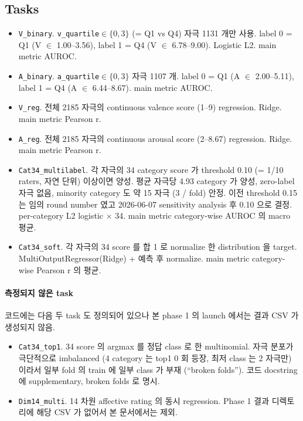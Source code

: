 \documentclass[a4paper,11pt]{article}
\begin{document}
\subsection{Tasks}

\begin{itemize}[leftmargin=*, itemsep=2pt]
  \item \texttt{V\_binary}. \texttt{v\_quartile}$\in\{0,3\}$ (= Q1 vs Q4) 자극 1131 개만 사용. label 0 = Q1 (V $\in$ 1.00--3.56), label 1 = Q4 (V $\in$ 6.78--9.00). Logistic L2. main metric AUROC.
  \item \texttt{A\_binary}. \texttt{a\_quartile}$\in\{0,3\}$ 자극 1107 개. label 0 = Q1 (A $\in$ 2.00--5.11), label 1 = Q4 (A $\in$ 6.44--8.67). main metric AUROC.
  \item \texttt{V\_reg}. 전체 2185 자극의 continuous valence score (1--9) regression. Ridge. main metric Pearson r.
  \item \texttt{A\_reg}. 전체 2185 자극의 continuous arousal score (2--8.67) regression. Ridge. main metric Pearson r.
  \item \texttt{Cat34\_multilabel}. 각 자극의 34 category score 가 threshold 0.10 (= 1/10 raters, 자연 단위) 이상이면 양성. 평균 자극당 4.93 category 가 양성, zero-label 자극 없음, minority category 도 약 15 자극 (3 / fold) 안정. 이전 threshold 0.15 는 임의 round number 였고 2026-06-07 sensitivity analysis 후 0.10 으로 결정. per-category L2 logistic $\times$ 34. main metric category-wise AUROC 의 macro 평균.
  \item \texttt{Cat34\_soft}. 각 자극의 34 score 를 합 1 로 normalize 한 distribution 을 target. MultiOutputRegressor(Ridge) + 예측 후 normalize. main metric category-wise Pearson r 의 평균.
\end{itemize}

\paragraph{측정되지 않은 task} 코드에는 다음 두 task 도 정의되어 있으나 본 phase 1 의 launch 에서는 결과 CSV 가 생성되지 않음.
\begin{itemize}[leftmargin=*, itemsep=2pt]
  \item \texttt{Cat34\_top1}. 34 score 의 argmax 를 정답 class 로 한 multinomial. 자극 분포가 극단적으로 imbalanced (4 category 는 top1 0 회 등장, 최저 class 는 2 자극만) 이라서 일부 fold 의 train 에 일부 class 가 부재 (``broken folds''). 코드 docstring 에 supplementary, broken folds 로 명시.
  \item \texttt{Dim14\_multi}. 14 차원 affective rating 의 동시 regression. Phase 1 결과 디렉토리에 해당 CSV 가 없어서 본 문서에서는 제외.
\end{itemize}
\end{document}

